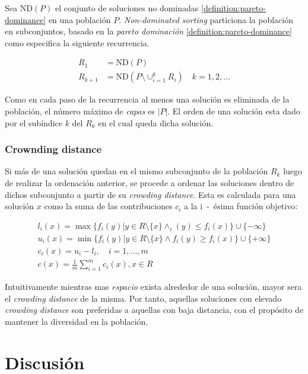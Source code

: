 Sea $\text{ND}(P)$ el conjunto de soluciones no dominadas \ref{definition:pareto-dominance} en una población $P$.
\emph{Non-dominated sorting} particiona la población en subconjuntos, basado en la \emph{pareto dominación} \ref{definition:pareto-dominance} como especifica la siguiente recurrencia.

\begin{align}
    R_1 &= \text{ND}(P) \\
    R_{k+1} &= \text{ND}(P \setminus \cup_{i=1}^k R_i) \quad k = 1,2, \dots
\end{align}

Como en cada paso de la recurrencia al menos una solución es eliminada de la población, el número máximo de \emph{capas} es $|P|$.
El orden de una solución esta dado por el subíndice $k$ del $R_k$ en el cual queda dicha solución.

\subsubsection{Crownding distance}\label{section:crowding-distance}

Si más de una solución quedan en el mismo subconjunto de la población $R_k$ luego de realizar la ordenación anterior, se procede a ordenar las soluciones dentro de dichos subconjunto a partir de su \emph{crowding distance}.
Esta es calculada para una solución $x$ como la suma de las contribuciones $c_i$ a la i~-~ésima función objetivo:

\begin{align}
    l_i(x) = \max \{ f_i(y) | y \in R \setminus \{x\} \wedge_i(y) \leq f_i(x) \} \cup \{-\infty\} \\
    u_i(x) = \min \{ f_i(y) | y \in R \setminus \{x\} \wedge f_i(y) \geq f_i(x) \} \cup \{+\infty\} \\
    c_i(x) = u_i - l_i, \quad i = 1, \dots, m \\
    c(x)   = \frac{1}{m} \sum_{i=1}^m c_i(x), x \in R
\end{align}

Intuitivamente mientras mas \textit{espacio} exista alrededor de una solución, mayor sera el \emph{crowding distance} de la misma.
Por tanto, aquellas soluciones con elevado \emph{crowding distance} son preferidas a aquellas con baja distancia, con el propósito de mantener la diversidad en la población.

\section{Discusión}\label{discussion}

